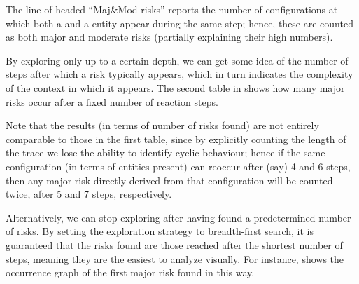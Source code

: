 The line of  headed ``Maj\&Mod risks'' reports the number of configurations at which both a \major and a \moderate entity appear during the same step; hence, these are counted as both major and moderate risks (partially explaining their high numbers).
 
\medskip\noindent By exploring only up to a certain depth, we can get some idea of the number of steps after which a risk typically appears, which in turn indicates the complexity of the context in which it appears. The second table in  shows how many major risks occur after a fixed number of reaction steps.

Note that the results (in terms of number of risks found) are not entirely comparable to those in the first table, since by explicitly counting the length of the trace we lose the ability to identify cyclic behaviour; hence if the same configuration (in terms of entities present) can reoccur after (say) 4 and 6 steps, then any major risk directly derived from that configuration will be counted twice, after 5 and 7 steps, respectively.

\medskip\noindent Alternatively, we can stop exploring after having found a predetermined number of risks. By setting the exploration strategy to breadth-first search, it is guaranteed that the risks found are those reached after the shortest number of steps, meaning they are the easiest to analyze visually. For instance,  shows the occurrence graph of the first major risk found in this way.

